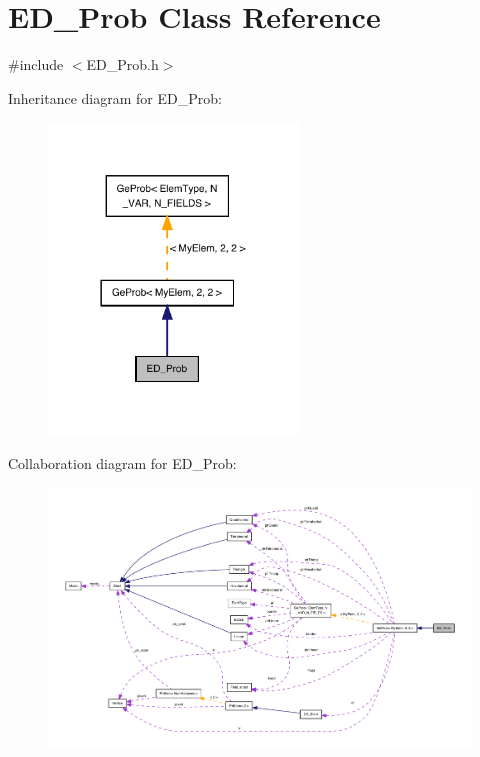 \hypertarget{classED__Prob}{}\section{E\+D\+\_\+\+Prob Class Reference}
\label{classED__Prob}


{\ttfamily \#include $<$E\+D\+\_\+\+Prob.\+h$>$}



Inheritance diagram for E\+D\+\_\+\+Prob\+:
\nopagebreak
\begin{figure}[H]
\begin{center}
\leavevmode
\includegraphics[width=189pt]{classED__Prob__inherit__graph}
\end{center}
\end{figure}


Collaboration diagram for E\+D\+\_\+\+Prob\+:
\nopagebreak
\begin{figure}[H]
\begin{center}
\leavevmode
\includegraphics[width=350pt]{classED__Prob__coll__graph}
\end{center}
\end{figure}
